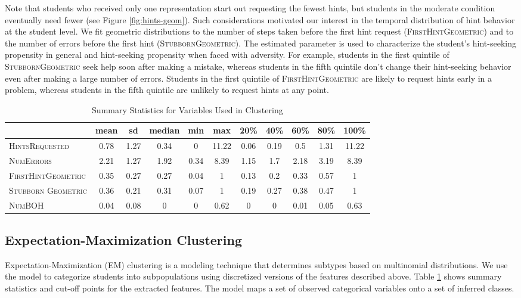 \documentclass{edm_template}
\newcommand{\ftr}[1]{\textsc{#1}}
\begin{document}
Note that students who received only one representation start out requesting the fewest hints, but students in the moderate condition eventually need fewer  (see Figure \ref{fig:hints-geom}). Such considerations motivated our interest in the temporal distribution of hint behavior at the student level. We fit geometric distributions to the number of steps taken before the first hint request (\ftr{FirstHintGeometric}) and to the number of errors before the first hint (\ftr{StubbornGeometric}). The estimated parameter is used to characterize the student's hint-seeking propensity in general and hint-seeking propensity when faced with adversity. For example, students in the first quintile of \ftr{StubbornGeometric} seek help soon after making a mistake, whereas students in the fifth quintile don't change their hint-seeking behavior even after making a large number of errors. Students in the first quintile of \ftr{FirstHintGeometric} are likely to request hints early in a problem, whereas students in the fifth quintile are unlikely to request hints at any point.
\begin{table}[htbp]
\caption{Summary Statistics for Variables Used in Clustering}
\begin{center}
\begin{tabular}{| l || c | c || c | c | c || c | c | c | c | c |}
\hline
&mean& sd&median&min&max&20\%&40\%&60\%&	80\%&100\%\\ \hline \hline
\ftr{HintsRequested}&0.78&1.27&0.34&0&11.22&0.06&0.19&0.5&1.31&11.22\\ \hline
\ftr{NumErrors}&2.21&1.27&1.92&0.34&8.39&1.15&1.7&2.18&3.19&8.39\\ \hline 
\ftr{FirstHintGeometric}&0.35&0.27&0.27&0.04&1&0.13&0.2&0.33&0.57&1\\ \hline
\ftr{Stubborn Geometric}&0.36&0.21&0.31&0.07&1&0.19&0.27&0.38&0.47&1\\ \hline
\ftr{NumBOH}&0.04&0.08&0&0&0.62&0&0&0.01&0.05&0.63\\ \hline
 \end{tabular}
\end{center}
\label{tab:sumstats}
\end{table}

\subsection{Expectation-Maximization Clustering}
\label{sec:EM-clust}

Expectation-Maximization (EM) clustering is a modeling technique that determines subtypes based on multinomial distributions. We use the model to categorize students into subpopulations using discretized versions of the features described above. Table \ref{tab:sumstats} shows summary statistics and cut-off points for the extracted features. The model maps a set of observed categorical variables onto a set of inferred classes. 
\end{document}
